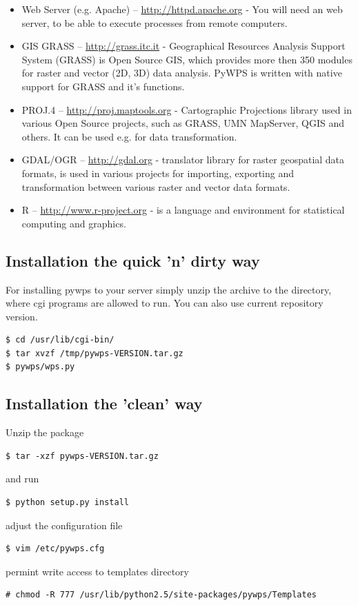 \documentclass[a4paper,11pt]{article}
\begin{document}
\begin{itemize}
    \item Web Server (e.g. Apache) -- \url{http://httpd.apache.org} -  You
    will need an web server, to be able to execute processes from remote
    computers.

    \item GIS GRASS  -- \url{http://grass.itc.it} - Geographical Resources
    Analysis Support System (GRASS) is Open Source GIS, which provides more
    then 350 modules for raster and vector (2D, 3D) data analysis. PyWPS is
    written with native support for GRASS and it's functions.

    \item PROJ.4  -- \url{http://proj.maptools.org} - Cartographic
    Projections library used in various Open Source projects, such as
    GRASS, UMN MapServer, QGIS and others. It can be used e.g. for data
    transformation.

    \item GDAL/OGR  -- \url{http://gdal.org} - translator library for
    raster geospatial data formats, is used in various projects for
    importing, exporting and transformation between various raster and vector
    data formats.

    \item R  -- \url{http://www.r-project.org} - is a language and environment
    for statistical computing and graphics.

\end{itemize}
    
\subsection{Installation the quick 'n' dirty way}
For installing pywps to your server simply unzip the archive to the
directory, where cgi programs are allowed to run. You can also use current
repository version.

\begin{verbatim}
$ cd /usr/lib/cgi-bin/
$ tar xvzf /tmp/pywps-VERSION.tar.gz
$ pywps/wps.py
\end{verbatim}

\subsection{Installation the 'clean' way}
Unzip the package 
\begin{verbatim}
$ tar -xzf pywps-VERSION.tar.gz
\end{verbatim}
and run 
\begin{verbatim}
$ python setup.py install
\end{verbatim} 
adjust the configuration file 
\begin{verbatim}
$ vim /etc/pywps.cfg
\end{verbatim} 
permint write access to templates directory
\begin{verbatim}
# chmod -R 777 /usr/lib/python2.5/site-packages/pywps/Templates
\end{verbatim} 
\end{document}
